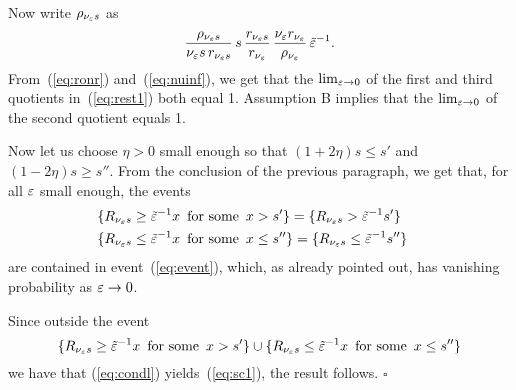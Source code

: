 Now write $\rho_{\nu_\varepsilon s}$
as
\begin{equation}
\label{eq:rest1}
\frac{\rho_{\nu_\eps s}}{\nu_\eps s\,r_{\nu_\eps s}}\,%
s\,
\frac{r_{\nu_\eps s}}{r_{\nu_\eps}}\,
\frac{\nu_\eps r_{\nu_\eps}}{\rho_{\nu_\eps}}\,\te^{-1}.
\end{equation}
From~(\ref{eq:ronr}) and~(\ref{eq:nuinf}), we get that the $\lim_{\varepsilon\to0}$ of the first and third quotients in~(\ref{eq:rest1}) both equal 1.
Assumption B %
implies that the $\lim_{\varepsilon\to0}$ of the second quotient equals 1.

Now let us choose $\eta>0$ small enough so that $(1+2\eta)s\leq s'$ and $(1-2\eta)s\geq s''$. 
From the conclusion of the previous paragraph, we get that, for all $\varepsilon$ small enough, the events
\begin{eqnarray}
\label{eq:events}
&\{R_{\nu_\eps s}\geq\te^{-1} x\,\mbox{ for some }\,x>s'\}=\{R_{\nu_\eps s}>\te^{-1}s'\}&\\
&\{R_{\nu_\eps s}\leq\te^{-1} x\,\mbox{ for some }\,x\leq s''\}=\{R_{\nu_\eps s}\leq\te^{-1}s''\}&
\end{eqnarray}
are contained in event~(\ref{eq:event}), which, as already pointed out, has vanishing probability as $\varepsilon\to0$. 

Since outside the event 
\begin{equation}
\label{eq:union}
\{R_{\nu_\eps s}\geq\te^{-1} x\,\mbox{ for some }\,x>s'\}\cup\{R_{\nu_\eps s}\leq\te^{-1} x\,\mbox{ for some }\,x\leq s''\}
\end{equation}
we have that
(\ref{eq:condl}) yields~(\ref{eq:sc1}), the result follows. 
%
$\square$

